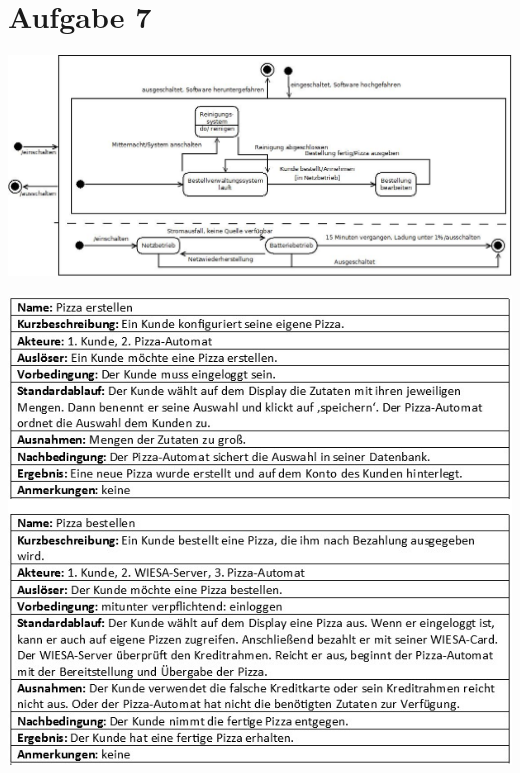 \section*{Aufgabe 7}
\includegraphics*[width=\textwidth,height=\textheight,keepaspectratio]{Aufgabe7.jpeg}

\includegraphics[width=\textwidth,height=\textheight,keepaspectratio]{Aufgabe4 Faelle.jpg}